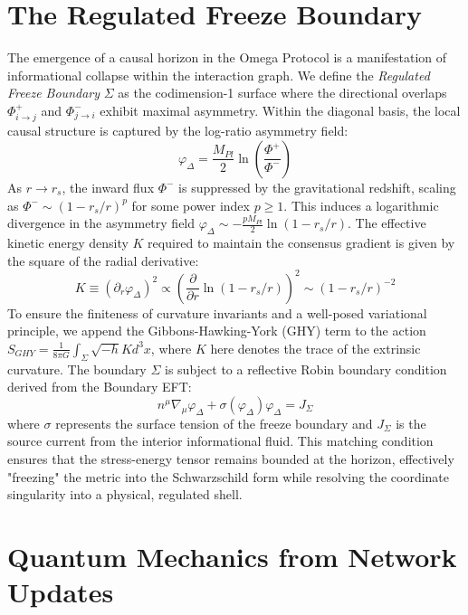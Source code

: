 \documentclass[11pt,template]{article}
\begin{document}
\section{The Regulated Freeze Boundary}

The emergence of a causal horizon in the Omega Protocol is a manifestation of informational collapse within the interaction graph. We define the \textit{Regulated Freeze Boundary} $\Sigma$ as the codimension-1 surface where the directional overlaps $\Phi^+_{i \to j}$ and $\Phi^-_{j \to i}$ exhibit maximal asymmetry. Within the diagonal basis, the local causal structure is captured by the log-ratio asymmetry field:
\begin{equation}
    \varphi_\Delta = \frac{M_{Pl}}{2} \ln \left( \frac{\Phi^+}{\Phi^-} \right)
\end{equation}
As $r \to r_s$, the inward flux $\Phi^-$ is suppressed by the gravitational redshift, scaling as $\Phi^- \sim (1 - r_s/r)^p$ for some power index $p \ge 1$. This induces a logarithmic divergence in the asymmetry field $\varphi_\Delta \sim -\frac{p M_{Pl}}{2} \ln(1 - r_s/r)$. The effective kinetic energy density $K$ required to maintain the consensus gradient is given by the square of the radial derivative:
\begin{equation}
    K \equiv (\partial_r \varphi_\Delta)^2 \propto \left( \frac{\partial}{\partial r} \ln(1 - r_s/r) \right)^2 \sim (1 - r_s/r)^{-2}
\end{equation}
To ensure the finiteness of curvature invariants and a well-posed variational principle, we append the Gibbons-Hawking-York (GHY) term to the action $S_{GHY} = \frac{1}{8\pi G} \int_{\Sigma} \sqrt{-h} K d^3x$, where $K$ here denotes the trace of the extrinsic curvature. The boundary $\Sigma$ is subject to a reflective Robin boundary condition derived from the Boundary EFT:
\begin{equation}
    n^\mu \nabla_\mu \varphi_\Delta + \sigma(\varphi_\Delta) \varphi_\Delta = J_\Sigma
\end{equation}
where $\sigma$ represents the surface tension of the freeze boundary and $J_\Sigma$ is the source current from the interior informational fluid. This matching condition ensures that the stress-energy tensor remains bounded at the horizon, effectively "freezing" the metric into the Schwarzschild form while resolving the coordinate singularity into a physical, regulated shell.

\section{Quantum Mechanics from Network Updates}
\end{document}
